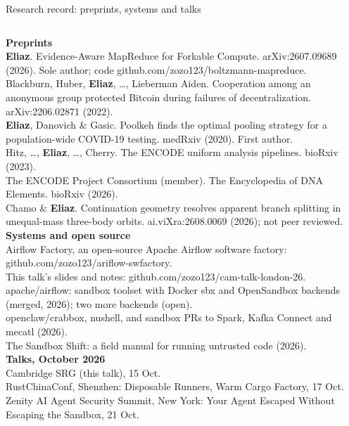 \begin{frame}[t]{Research record: preprints, systems and talks}
\vspace{0pt}
{\fontsize{7.6}{9.2}\selectfont
\begin{columns}[T,onlytextwidth]
\textbf{Preprints}\\
\textbf{Eliaz}. Evidence-Aware MapReduce for Forkable Compute. arXiv:2607.09689 (2026). Sole author; code github.com/zozo123/boltzmann-mapreduce.\\
Blackburn, Huber, \textbf{Eliaz}, \dots, Lieberman Aiden. Cooperation among an anonymous group protected Bitcoin during failures of decentralization. arXiv:2206.02871 (2022).\\
\textbf{Eliaz}, Danovich \& Gasic. Poolkeh finds the optimal pooling strategy for a population-wide COVID-19 testing. medRxiv (2020). First author.\\
Hitz, \dots, \textbf{Eliaz}, \dots, Cherry. The ENCODE uniform analysis pipelines. bioRxiv (2023).\\
The ENCODE Project Consortium (member). The Encyclopedia of DNA Elements. bioRxiv (2026).\\
Chamo \& \textbf{Eliaz}. Continuation geometry resolves apparent branch splitting in unequal-mass three-body orbits. ai.viXra:2608.0069 (2026); not peer reviewed.
\textbf{Systems and open source}\\
Airflow Factory, an open-source Apache Airflow software factory: github.com/zozo123/ariflow-swfactory.\\
This talk's slides and notes: github.com/zozo123/cam-talk-london-26.\\
apache/airflow: sandbox toolset with Docker sbx and OpenSandbox backends (merged, 2026); two more backends (open).\\
openclaw/crabbox, nushell, and sandbox PRs to Spark, Kafka Connect and mecatl (2026).\\
The Sandbox Shift: a field manual for running untrusted code (2026).\\[3pt]
\textbf{Talks, October 2026}\\
Cambridge SRG (this talk), 15 Oct.\\
RustChinaConf, Shenzhen: Disposable Runners, Warm Cargo Factory, 17 Oct.\\
Zenity AI Agent Security Summit, New York: Your Agent Escaped Without Escaping the Sandbox, 21 Oct.
\end{columns}\par}
\end{frame}
